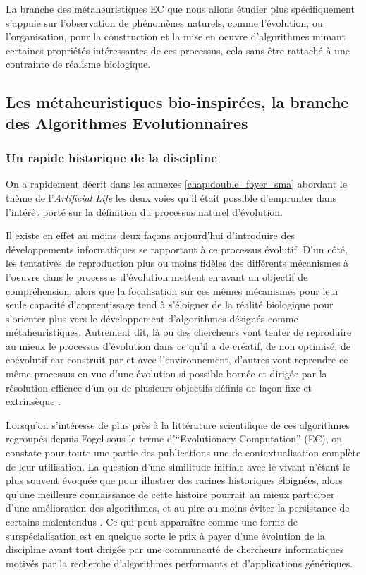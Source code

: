 La branche des métaheuristiques EC que nous allons étudier plus spécifiquement s'appuie sur l'observation de phénomènes naturels, comme l'évolution, ou l'organisation, pour la construction et la mise en oeuvre d'algorithmes mimant certaines propriétés intéressantes de ces processus, cela sans être rattaché à une contrainte de réalisme biologique.

\subsection{Les métaheuristiques bio-inspirées, la branche des Algorithmes Evolutionnaires}
\label{ssec:EA}

\subsubsection{Un rapide historique de la discipline}
\label{sssec:historique_EA}

On a rapidement décrit dans les annexes \ref{chap:double_foyer_sma} abordant le thème de l'\textit{Artificial Life} les deux voies qu'il était possible d'emprunter dans l'intérêt porté sur la définition du processus naturel d'évolution.

Il existe en effet au moins deux façons aujourd'hui d'introduire des développements informatiques se rapportant à ce processus évolutif. D'un côté, les tentatives de reproduction plus ou moins fidèles des différents mécanismes à l'oeuvre dans le processus d'évolution mettent en avant un objectif de compréhension, alors que la focalisation sur ces mêmes mécanismes pour leur seule capacité d'apprentissage tend à s'éloigner de la réalité biologique pour s'orienter plus vers le développement d'algorithmes désignés comme métaheuristiques. Autrement dit, là ou des chercheurs vont tenter de reproduire au mieux le processus d'évolution dans ce qu'il a de créatif, de non optimisé, de coévolutif car construit par et avec l'environnement, d'autres vont reprendre ce même processus en vue d'une évolution si possible bornée et dirigée par la résolution efficace d'un ou de plusieurs objectifs définis de façon fixe et extrinsèque \autocites{Taylor2001, Taylor2012}.

Lorsqu'on s'intéresse de plus près à la littérature scientifique de ces algorithmes regroupés depuis Fogel sous le terme d'\foreignquote{english}{Evolutionary Computation} (EC), on constate pour toute une partie des publications une de-contextualisation complète de leur utilisation. La question d'une similitude initiale avec le vivant n'étant le plus souvent évoquée que pour illustrer des racines historiques éloignées, alors qu'une meilleure connaissance de cette histoire pourrait au mieux participer d'une amélioration des algorithmes, et au pire au moins éviter la persistance de certains malentendus \autocite{DeJong1993a}. Ce qui peut apparaître comme une forme de surspécialisation est en quelque sorte le prix à payer d'une évolution de la discipline avant tout dirigée par une communauté de chercheurs informatiques motivés par la recherche d'algorithmes performants et d'applications génériques.

